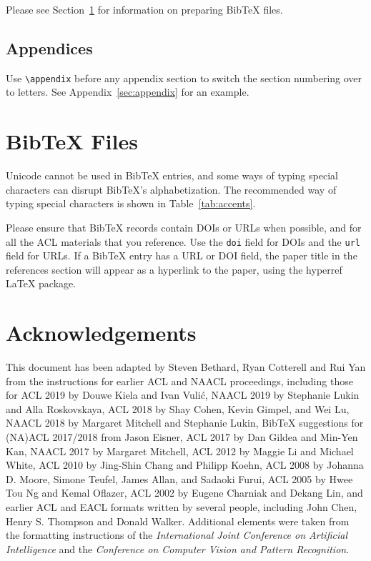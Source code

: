\documentclass[11pt]{article}
\begin{document}
Please see Section~\ref{sec:bibtex} for information on preparing Bib\TeX{} files.

\subsection{Appendices}

Use \verb|\appendix| before any appendix section to switch the section numbering over to letters. See Appendix~\ref{sec:appendix} for an example.

\section{Bib\TeX{} Files}
\label{sec:bibtex}

Unicode cannot be used in Bib\TeX{} entries, and some ways of typing special characters can disrupt Bib\TeX's alphabetization. The recommended way of typing special characters is shown in Table~\ref{tab:accents}.

Please ensure that Bib\TeX{} records contain DOIs or URLs when possible, and for all the ACL materials that you reference.
Use the \verb|doi| field for DOIs and the \verb|url| field for URLs.
If a Bib\TeX{} entry has a URL or DOI field, the paper title in the references section will appear as a hyperlink to the paper, using the hyperref \LaTeX{} package.

\section*{Acknowledgements}

This document has been adapted
by Steven Bethard, Ryan Cotterell and Rui Yan
from the instructions for earlier ACL and NAACL proceedings, including those for
ACL 2019 by Douwe Kiela and Ivan Vuli\'{c},
NAACL 2019 by Stephanie Lukin and Alla Roskovskaya,
ACL 2018 by Shay Cohen, Kevin Gimpel, and Wei Lu,
NAACL 2018 by Margaret Mitchell and Stephanie Lukin,
Bib\TeX{} suggestions for (NA)ACL 2017/2018 from Jason Eisner,
ACL 2017 by Dan Gildea and Min-Yen Kan,
NAACL 2017 by Margaret Mitchell,
ACL 2012 by Maggie Li and Michael White,
ACL 2010 by Jing-Shin Chang and Philipp Koehn,
ACL 2008 by Johanna D. Moore, Simone Teufel, James Allan, and Sadaoki Furui,
ACL 2005 by Hwee Tou Ng and Kemal Oflazer,
ACL 2002 by Eugene Charniak and Dekang Lin,
and earlier ACL and EACL formats written by several people, including
John Chen, Henry S. Thompson and Donald Walker.
Additional elements were taken from the formatting instructions of the \emph{International Joint Conference on Artificial Intelligence} and the \emph{Conference on Computer Vision and Pattern Recognition}.
\end{document}
